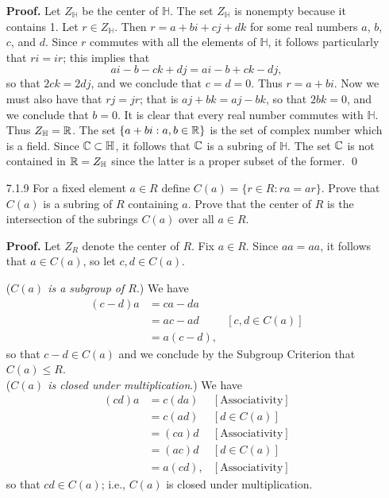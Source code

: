 \begin{enumerate}
      \textbf{Proof.} Let $Z_\mathbb{H}$ be the center of $\mathbb{H}$. The set
      $Z_\mathbb{H}$ is nonempty because it contains 1. Let
      $r \in Z_\mathbb{H}$. Then $r = a + bi + cj + dk$ for some real numbers
      $a$, $b$, $c$, and $d$. Since $r$ commutes with all the elements of
      $\mathbb{H}$, it follows particularly that $ri = ir$; this implies that
      $$ai - b - ck + dj = ai - b + ck - dj,$$
      so that $2ck = 2dj$, and we conclude that $c = d = 0$. Thus $r = a + bi$.
      Now we must also have that $rj = jr$; that is $aj + bk = aj - bk$, so that
      $2bk = 0$, and we conclude that $b = 0$. It is clear that every real
      number commutes with $\mathbb{H}$. Thus $Z_\mathbb{H} = \mathbb{R}$. The set
      $\{a + bi : a, b \in \mathbb{R}\}$ is the set of complex number which is a field.
      Since $\mathbb{C} \subset \mathbb{H}$, it follows that $\mathbb{C}$ is a subring of
      $\mathbb{H}$. The set $\mathbb{C}$ is not contained in $\mathbb{R} = Z_\mathbb{H}$ since 
      the latter is a proper subset of the former. \qed
   \item[7.1.9]   For a fixed element $a \in R$ define
                  $C(a) = \{r \in R : ra = ar\}$. Prove that $C(a)$ is a subring
                  of $R$ containing $a$. Prove that the center of $R$ is the
                  intersection of the subrings $C(a)$ over all $a \in R$.

      \textbf{Proof.} Let $Z_R$ denote the center of $R$. Fix $a \in R$. Since 
      $aa = aa$, it follows that $a \in C(a)$, so let $c, d \in C(a)$.

      (\textit{$C(a)$ is a subgroup of $R$}.) We have
      \begin{align*}
         (c - d)a &= ca - da \\
                  &= ac - ad &[c, d \in C(a)] \\
                  &= a(c - d),
      \end{align*}
      so that $c - d \in C(a)$ and we conclude by the Subgroup Criterion that
      $C(a) \le R$. \\

      (\textit{$C(a)$ is closed under multiplication}.) We have
      \begin{align*}
         (cd)a &= c(da) &[\text{Associativity}] \\
               &= c(ad) &[d \in C(a)] \\
               &= (ca)d &[\text{Associativity}] \\
               &= (ac)d &[d \in C(a)] \\
               &= a(cd), &[\text{Associativity}]
      \end{align*}
      so that $cd \in C(a)$; i.e., $C(a)$ is closed under multiplication. \\


\end{enumerate}
